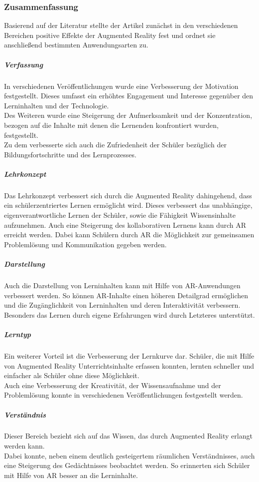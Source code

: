 \subsubsection{Zusammenfassung}
Basierend auf der Literatur stellte der Artikel zunächst in den verschiedenen Bereichen positive Effekte der Augmented Reality fest und ordnet sie anschließend bestimmten Anwendungsarten zu.

\subparagraph{Verfassung}
In verschiedenen Veröffentlichungen wurde eine Verbesserung der Motivation festgestellt. Dieses umfasst ein erhöhtes Engagement und Interesse gegenüber den Lerninhalten und der Technologie.\\
Des Weiteren wurde eine Steigerung der Aufmerksamkeit und der Konzentration, bezogen auf die Inhalte mit denen die Lernenden konfrontiert wurden, festgestellt.\\
Zu dem verbesserte sich auch die Zufriedenheit der Schüler bezüglich der Bildungsfortschritte und des Lernprozesses. 
\citep[Kapitel 4.1]{diegmann:benefits-ar}

\subparagraph{Lehrkonzept}
Das Lehrkonzept verbessert sich durch die Augmented Reality dahingehend, dass ein schülerzentriertes Lernen ermöglicht wird. Dieses verbessert das unabhängige, eigenverantwortliche Lernen der Schüler, sowie die Fähigkeit Wissensinhalte aufzunehmen. Auch eine Steigerung des kollaborativen Lernens kann durch AR erreicht werden. Dabei kann Schülern durch AR die Möglichkeit zur gemeinsamen Problemlösung und Kommunikation gegeben werden.
\citep[Kapitel 4.2]{diegmann:benefits-ar}

\subparagraph{Darstellung}
Auch die Darstellung von Lerninhalten kann mit Hilfe von AR-Anwendungen verbessert werden. So können AR-Inhalte einen höheren Detailgrad ermöglichen und die Zugänglichkeit von Lerninhalten und deren Interaktivität verbessern. Besonders das Lernen durch eigene Erfahrungen wird durch Letzteres unterstützt.
\citep[Kapitel 4.3]{diegmann:benefits-ar}

\subparagraph{Lerntyp}
Ein weiterer Vorteil ist die Verbesserung der Lernkurve dar. Schüler, die mit Hilfe von Augmented Reality Unterrichtsinhalte erfassen konnten, lernten schneller und einfacher als Schüler ohne diese Möglichkeit.\\
Auch eine Verbesserung der Kreativität, der Wissensaufnahme und der Problemlösung konnte in verschiedenen Veröffentlichungen festgestellt werden.
\citep[Kapitel 4.4]{diegmann:benefits-ar}

\subparagraph{Verständnis}
Dieser Bereich bezieht sich auf das Wissen, das durch Augmented Reality erlangt werden kann.\\
Dabei konnte, neben einem deutlich gesteigertem räumlichen Verständnisses, auch eine Steigerung des Gedächtnisses beobachtet werden. So erinnerten sich Schüler mit Hilfe von AR besser an die Lerninhalte. \\
\citep[Kapitel 4.5]{diegmann:benefits-ar}

